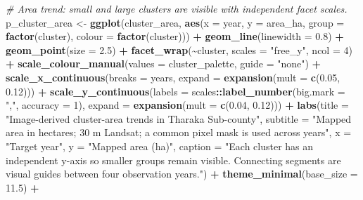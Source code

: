 \documentclass[
]{article}
\newenvironment{Shaded}{\begin{snugshade}}{\end{snugshade}}
\newcommand{\AttributeTok}[1]{\textcolor[rgb]{0.13,0.29,0.53}{#1}}
\newcommand{\CommentTok}[1]{\textcolor[rgb]{0.56,0.35,0.01}{\textit{#1}}}
\newcommand{\DecValTok}[1]{\textcolor[rgb]{0.00,0.00,0.81}{#1}}
\newcommand{\FloatTok}[1]{\textcolor[rgb]{0.00,0.00,0.81}{#1}}
\newcommand{\FunctionTok}[1]{\textcolor[rgb]{0.13,0.29,0.53}{\textbf{#1}}}
\newcommand{\NormalTok}[1]{#1}
\newcommand{\OtherTok}[1]{\textcolor[rgb]{0.56,0.35,0.01}{#1}}
\newcommand{\SpecialCharTok}[1]{\textcolor[rgb]{0.81,0.36,0.00}{\textbf{#1}}}
\newcommand{\StringTok}[1]{\textcolor[rgb]{0.31,0.60,0.02}{#1}}
\newcounter{none} %
\begin{document}
\begin{Shaded}
\begin{Highlighting}[]
\CommentTok{\# Area trend: small and large clusters are visible with independent facet scales.}
\NormalTok{p\_cluster\_area }\OtherTok{\textless{}{-}} \FunctionTok{ggplot}\NormalTok{(cluster\_area, }\FunctionTok{aes}\NormalTok{(}\AttributeTok{x =}\NormalTok{ year, }\AttributeTok{y =}\NormalTok{ area\_ha, }\AttributeTok{group =} \FunctionTok{factor}\NormalTok{(cluster), }\AttributeTok{colour =} \FunctionTok{factor}\NormalTok{(cluster))) }\SpecialCharTok{+}
  \FunctionTok{geom\_line}\NormalTok{(}\AttributeTok{linewidth =} \FloatTok{0.8}\NormalTok{) }\SpecialCharTok{+} \FunctionTok{geom\_point}\NormalTok{(}\AttributeTok{size =} \FloatTok{2.5}\NormalTok{) }\SpecialCharTok{+}
  \FunctionTok{facet\_wrap}\NormalTok{(}\SpecialCharTok{\textasciitilde{}}\NormalTok{cluster, }\AttributeTok{scales =} \StringTok{"free\_y"}\NormalTok{, }\AttributeTok{ncol =} \DecValTok{4}\NormalTok{) }\SpecialCharTok{+}
  \FunctionTok{scale\_colour\_manual}\NormalTok{(}\AttributeTok{values =}\NormalTok{ cluster\_palette, }\AttributeTok{guide =} \StringTok{"none"}\NormalTok{) }\SpecialCharTok{+}
  \FunctionTok{scale\_x\_continuous}\NormalTok{(}\AttributeTok{breaks =}\NormalTok{ years, }\AttributeTok{expand =} \FunctionTok{expansion}\NormalTok{(}\AttributeTok{mult =} \FunctionTok{c}\NormalTok{(}\FloatTok{0.05}\NormalTok{, }\FloatTok{0.12}\NormalTok{))) }\SpecialCharTok{+}
  \FunctionTok{scale\_y\_continuous}\NormalTok{(}\AttributeTok{labels =}\NormalTok{ scales}\SpecialCharTok{::}\FunctionTok{label\_number}\NormalTok{(}\AttributeTok{big.mark =} \StringTok{","}\NormalTok{, }\AttributeTok{accuracy =} \DecValTok{1}\NormalTok{), }\AttributeTok{expand =} \FunctionTok{expansion}\NormalTok{(}\AttributeTok{mult =} \FunctionTok{c}\NormalTok{(}\FloatTok{0.04}\NormalTok{, }\FloatTok{0.12}\NormalTok{))) }\SpecialCharTok{+}
  \FunctionTok{labs}\NormalTok{(}\AttributeTok{title =} \StringTok{"Image{-}derived cluster{-}area trends in Tharaka Sub{-}county"}\NormalTok{,}
       \AttributeTok{subtitle =} \StringTok{"Mapped area in hectares; 30 m Landsat; a common pixel mask is used across years"}\NormalTok{,}
       \AttributeTok{x =} \StringTok{"Target year"}\NormalTok{, }\AttributeTok{y =} \StringTok{"Mapped area (ha)"}\NormalTok{,}
       \AttributeTok{caption =} \StringTok{"Each cluster has an independent y{-}axis so smaller groups remain visible. Connecting segments are visual guides between four observation years."}\NormalTok{) }\SpecialCharTok{+}
  \FunctionTok{theme\_minimal}\NormalTok{(}\AttributeTok{base\_size =} \FloatTok{11.5}\NormalTok{) }\SpecialCharTok{+}

\end{Highlighting}
\end{Shaded}
\end{document}
